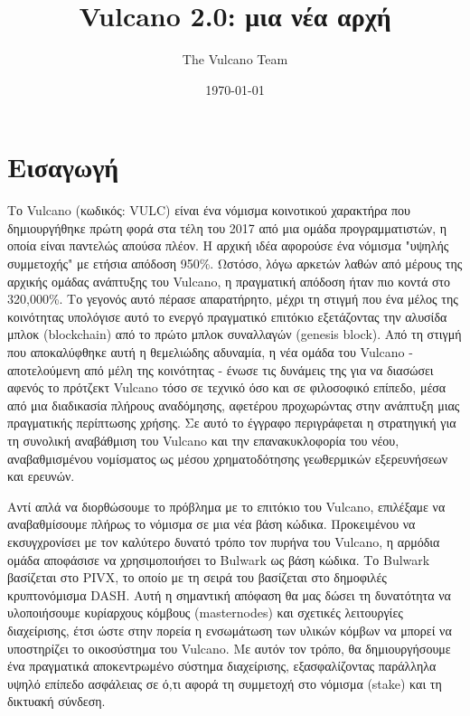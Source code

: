 \documentclass[A4paper, 12pt]{article}
\begin{document}
\title{Vulcano 2.0: μια νέα αρχή}
\author{The Vulcano Team}
\date{\today}

\newpage
\tableofcontents
\newpage
\section{Εισαγωγή}

Το Vulcano (κωδικός: VULC) είναι ένα νόμισμα κοινοτικού χαρακτήρα που δημιουργήθηκε πρώτη φορά στα τέλη του 2017 από μια ομάδα προγραμματιστών, η οποία είναι παντελώς απούσα πλέον. Η αρχική ιδέα αφορούσε ένα νόμισμα "υψηλής συμμετοχής" με ετήσια απόδοση 950\%. Ωστόσο, λόγω αρκετών λαθών από μέρους της αρχικής ομάδας ανάπτυξης του Vulcano, η πραγματική απόδοση ήταν πιο κοντά στο 320,000\%. Το γεγονός αυτό πέρασε απαρατήρητο, μέχρι τη στιγμή που ένα μέλος της κοινότητας υπολόγισε αυτό το ενεργό πραγματικό επιτόκιο εξετάζοντας την αλυσίδα μπλοκ (blockchain) από το πρώτο μπλοκ συναλλαγών (genesis block). Από τη στιγμή που αποκαλύφθηκε αυτή η θεμελιώδης αδυναμία, η νέα ομάδα του Vulcano - αποτελούμενη από μέλη της κοινότητας - ένωσε τις δυνάμεις της για να διασώσει αφενός το πρότζεκτ Vulcano τόσο σε τεχνικό όσο και σε φιλοσοφικό επίπεδο, μέσα από μια διαδικασία πλήρους αναδόμησης, αφετέρου προχωρώντας στην ανάπτυξη μιας πραγματικής περίπτωσης χρήσης. Σε αυτό το έγγραφο περιγράφεται η στρατηγική για τη συνολική αναβάθμιση του Vulcano και την επανακυκλοφορία του νέου, αναβαθμισμένου νομίσματος ως μέσου χρηματοδότησης γεωθερμικών εξερευνήσεων και ερευνών.

Αντί απλά να διορθώσουμε το πρόβλημα με το επιτόκιο του Vulcano, επιλέξαμε να αναβαθμίσουμε πλήρως το νόμισμα σε μια νέα βάση κώδικα. Προκειμένου να εκσυγχρονίσει με τον καλύτερο δυνατό τρόπο τον πυρήνα του Vulcano, η αρμόδια ομάδα αποφάσισε να χρησιμοποιήσει το Bulwark ως βάση κώδικα. Το Bulwark βασίζεται στο PIVX, το οποίο με τη σειρά του βασίζεται στο δημοφιλές κρυπτονόμισμα DASH. Αυτή η σημαντική απόφαση θα μας δώσει τη δυνατότητα να υλοποιήσουμε κυρίαρχους κόμβους (masternodes) και σχετικές λειτουργίες διαχείρισης, έτσι ώστε στην πορεία η ενσωμάτωση των υλικών κόμβων να μπορεί να υποστηρίζει το οικοσύστημα του Vulcano. Με αυτόν τον τρόπο, θα δημιουργήσουμε ένα πραγματικά αποκεντρωμένο σύστημα διαχείρισης, εξασφαλίζοντας παράλληλα υψηλό επίπεδο ασφάλειας σε ό,τι αφορά τη συμμετοχή στο νόμισμα (stake) και τη δικτυακή σύνδεση.
\end{document}
